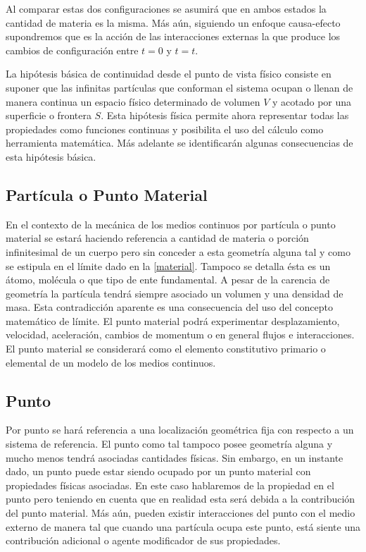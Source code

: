 \documentclass[../notas medios.tex]{subfiles}
\begin{document}
Al comparar estas dos configuraciones se asumirá que en ambos estados la
cantidad de materia es la misma.  Más aún, siguiendo un enfoque causa-efecto supondremos que es la acción de las interacciones externas la que produce los cambios de configuración entre $t=0$ y $t=t$.

La hipótesis básica de continuidad desde el punto de vista físico consiste en suponer que las infinitas partículas que conforman el sistema ocupan o llenan de manera continua un espacio físico determinado de volumen $V$ y acotado por una superficie o frontera $S$.  Esta hipótesis física permite ahora representar todas las propiedades como funciones continuas y posibilita el uso del cálculo como herramienta matemática.  Más adelante se identificarán algunas consecuencias de esta hipótesis básica.


\subsection{Partícula o Punto Material}
En el contexto de la mecánica de los medios continuos por partícula o punto material se estará haciendo referencia a cantidad de materia o porción infinitesimal de un cuerpo pero sin conceder a esta geometría alguna tal y como se estipula en el límite dado en la \cref{material}.  Tampoco se detalla ésta es un átomo, molécula o que tipo de ente fundamental.  A pesar de la carencia de geometría la partícula tendrá siempre asociado un volumen y una densidad de masa.  Esta contradicción aparente es una consecuencia del uso del concepto matemático de límite.  El punto material podrá experimentar desplazamiento, velocidad, aceleración, cambios de momentum o en general flujos e interacciones.  El punto material se considerará como el elemento constitutivo primario o elemental de un modelo de los medios continuos.

\subsection{Punto}
Por punto se hará referencia a una localización geométrica fija con respecto a un sistema de referencia.  El punto como tal tampoco posee geometría alguna y mucho menos tendrá asociadas cantidades físicas.  Sin embargo, en un instante dado, un punto puede estar siendo ocupado por un punto material con propiedades físicas asociadas.  En este caso hablaremos de la propiedad en el punto pero teniendo en cuenta que en realidad esta será debida a la contribución del punto material.  Más aún, pueden existir interacciones del punto con el medio externo de manera tal que cuando una partícula ocupa este punto, está siente una contribución adicional o agente modificador de sus propiedades.
\end{document}

